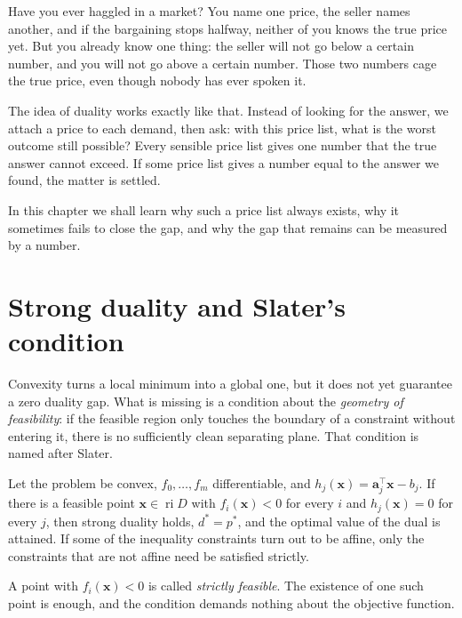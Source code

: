 \begin{untukanak}
Have you ever haggled in a market? You name one price, the seller names another, and if the
bargaining stops halfway, neither of you knows the true price yet. But you already know one
thing: the seller will not go below a certain number, and you will not go above a certain
number. Those two numbers cage the true price, even though nobody has ever spoken it.

The idea of duality works exactly like that. Instead of looking for the answer, we attach a
price to each demand, then ask: with this price list, what is the worst outcome still possible?
Every sensible price list gives one number that the true answer cannot exceed. If some price
list gives a number equal to the answer we found, the matter is settled.

In this chapter we shall learn why such a price list always exists, why it sometimes fails to
close the gap, and why the gap that remains can be measured by a number.
\end{untukanak}

\section{Strong duality and Slater's condition}

Convexity turns a local minimum into a global one, but it does not yet guarantee a zero
duality gap. What is missing is a condition about the \emph{geometry of feasibility}: if the
feasible region only touches the boundary of a constraint without entering it, there is no
sufficiently clean separating plane. That condition is named after Slater.

\begin{teorema}
Let the problem be convex, $f_{0},\dots,f_{m}$ differentiable, and
$h_{j}(\mathbf{x})=\mathbf{a}_{j}^{\top}\mathbf{x}-b_{j}$. If there is a feasible point
$\mathbf{x}\in\operatorname{ri}D$ with $f_{i}(\mathbf{x})<0$ for every $i$ and
$h_{j}(\mathbf{x})=0$ for every $j$, then strong duality holds, $d^{*}=p^{*}$, and the optimal
value of the dual is attained. If some of the inequality constraints turn out to be affine,
only the constraints that are not affine need be satisfied strictly.
\end{teorema}

A point with $f_{i}(\mathbf{x})<0$ is called \emph{strictly feasible}. The existence of one such
point is enough, and the condition demands nothing about the objective function.

